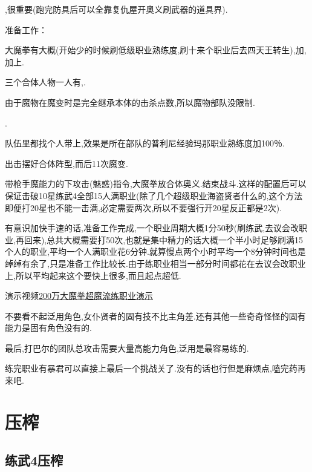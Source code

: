 		{\color{red}{记得练上魔女和兔兔莉亚,同步探索魔界收集41武器}},很重要(跑完防具后可以全靠复仇屋开奥义刷武器的道具界).

		准备工作：

		大魔拳有大概{\color{red}{200万能力}}(开始少的时候刷低级职业熟练度,刷十来个职业后去四天王转生),加{\color{red}{主角的魔能力[合体技增加100％攻击力]}},加上{\color{red}{女主的魔能力[被魅惑的目标会被即死]}}.

		三个合体人物一人有{\color{red}{枪手的能力+魅惑术}},{\color{red}{都带上飞蛾魔能力}}.

		由于魔物在魔变时是完全继承本体的击杀点数,所以魔物部队没限制.

		{\color{red}{四人放到普利尼部队}}.

		队伍里都找个人带上{\color{red}{暴君的普利尼训练能力}},效果是所在部队的普利尼经验玛那职业熟练度加100％.

		出击摆好合体阵型,而后11次魔变.

		带枪手魔能力的下攻击(魅惑)指令,大魔拳放合体奥义.结束战斗.这样的配置后可以保证击破10星练武4全部15人满职业(除了几个超级职业海盗贤者什么的,这个方法即便打20星也不能一击满,必定需要两次,所以不要强行开20星反正都是2次).

		有意识加快手速的话,准备工作完成,一个职业周期大概1分50秒(刷练武,去议会改职业,再回来),总共大概需要打50次,也就是集中精力的话大概一个半小时足够刷满15个人的职业,平均一个人满职业花6分钟.就算慢点两个小时平均一个8分钟时间也是绰绰有余了,只是准备工作比较长.由于练职业相当一部分时间都花在去议会改职业上,所以平均起来这个要快上很多,而且起点超低.

		演示视频\href{http://www.bilibili.com/video/av2966618/}{200万大魔拳超魔流练职业演示}

		不要看不起泛用角色,女仆贤者的固有技不比主角差.还有其他一些奇奇怪怪的固有能力是固有角色没有的.

		最后,打巴尔的团队总攻击需要大量高能力角色,泛用是最容易练的.

		练完职业有暴君可以直接上最后一个挑战关了.没有的话也行但是麻烦点,嗑完药再来吧.

	\newpage

	\section{压榨}

		\subsection{练武4压榨}

